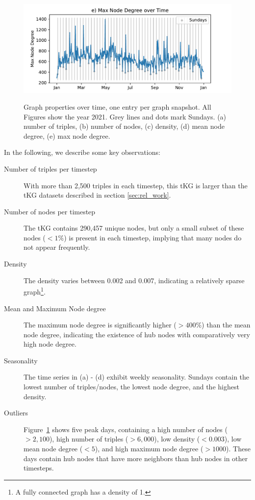 \begin{figure}[!t]
\begin{minipage}{0.49\textwidth}
\end{minipage}
\hfill
\begin{minipage}{0.49\textwidth}
	\centering
	\includegraphics[width=\textwidth]{figs/acled_subset_gta_aggregatedMax Node Degree.pdf}\\
\end{minipage}
\caption{Graph properties over time, one entry per graph snapshot. All Figures show the year 2021. 
Grey lines and dots mark Sundays. (a) number of triples, (b) number of nodes, (c) density, (d) mean node degree, (e) max node degree.}  
\label{fig:graph_params_timeseries}
\end{figure}

In the following, we describe some key observations: 
\begin{description}
    \item[Number of triples per timestep] With more than 2,500 triples in each timestep, this tKG is larger than the tKG datasets described in section \ref{sec:rel_work}.
    \item[Number of nodes per timestep] The tKG contains 290,457 unique nodes, but only a small subset of these nodes ($<1\%$) is present in each timestep, implying that many nodes do not appear frequently.
    \item[Density] The density varies between 0.002 and 0.007, indicating a relatively sparse graph\footnote{A fully connected graph has a density of 1.}.
    \item[Mean and Maximum Node degree] The maximum node degree is significantly higher ($>400\%$) than the mean node degree, indicating the existence of hub nodes with comparatively very high node degree.
    \item[Seasonality] The time series in (a) - (d) exhibit weekly seasonality. Sundays contain the lowest number of triples/nodes, the lowest node degree, and the highest density.
    \item[Outliers] Figure~\ref{fig:graph_params_timeseries} shows five peak days, containing a high number of nodes ($>2,100$), high number of triples ($>6,000$), low density ($<0.003$), low mean node degree ($<5$), and high maximum node degree ($>1000$). These days contain hub nodes that have more neighbors than hub nodes in other timesteps.
\end{description}

